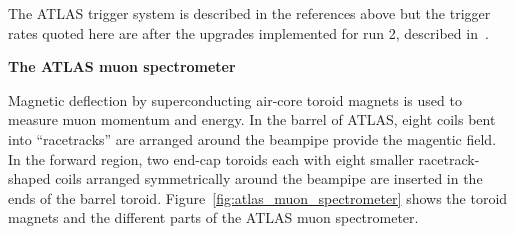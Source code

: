 The ATLAS trigger system is described in the references above but the trigger rates quoted here are after the upgrades implemented for run 2, described in~\cite{martinez_run-2_2016}.

\textbf{The ATLAS muon spectrometer}

Magnetic deflection by superconducting air-core toroid magnets is used to measure muon momentum and energy. In the barrel of ATLAS, eight coils bent into ``racetracks'' are arranged around the beampipe provide the magentic field. In the forward region, two end-cap toroids each with eight smaller racetrack-shaped coils arranged symmetrically around the beampipe are inserted in the ends of the barrel toroid. Figure~\ref{fig:atlas_muon_spectrometer} shows the toroid magnets and the different parts of the ATLAS muon spectrometer.

